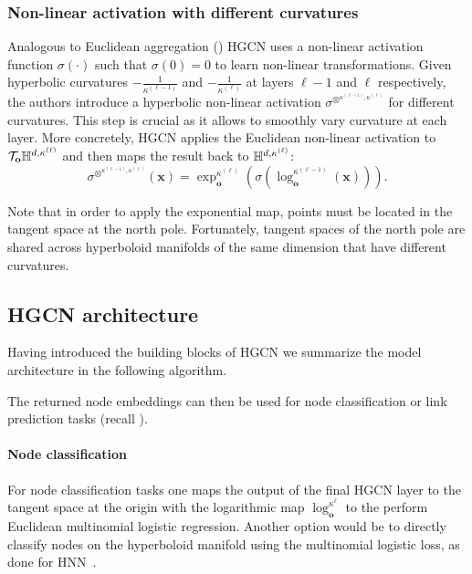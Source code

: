 \subsubsection{Non-linear activation with different curvatures}
Analogous to Euclidean aggregation () HGCN uses a non-linear activation function $\sigma(\cdot)$ such that $\sigma(0)=0$ to learn non-linear transformations. Given hyperbolic curvatures $-\frac{1}{\kappa^{(\ell-1)}}$ and $-\frac{1}{\kappa^{(\ell)}}$ at layers $\ell-1$ and $\ell$ respectively, the authors introduce a hyperbolic non-linear activation $\sigma^{\otimes^{\kappa^{(\ell-1)}, \kappa^{(\ell)}}}$ for different curvatures. This step is crucial as it allows to smoothly vary curvature at each layer. More concretely, HGCN applies the Euclidean non-linear activation to $\mathcal{T}_\mathbf{o}\mathbb{H}^{d,\kappa^{(\ell)}}$ and then maps the result back to $\mathbb{H}^{d,\kappa^{(\ell)}}$:
\begin{equation*}
    \sigma^{\otimes^{\kappa^{(\ell-1)}, \kappa^{(\ell)}}}(\mathbf{x}) = \exp_{\mathbf{o}}^{\kappa^{(\ell)}}\left(\sigma\left(\log_{\mathbf{o}}^{\kappa^{(\ell-1)}}(\mathbf{x})\right)\right).
\end{equation*}

Note that in order to apply the exponential map, points must be located in the tangent space at the north pole. Fortunately, tangent spaces of the north pole are shared across hyperboloid manifolds of the same dimension that have different curvatures.

\subsection{HGCN architecture}\label{sec:hgcnArchitecture}
Having introduced the building blocks of HGCN we summarize the model architecture in the following algorithm.


The returned node embeddings can then be used for node classification or link prediction tasks (recall ).

\paragraph{Node classification}
For node classification tasks one maps the output of the final HGCN layer to the tangent space at the origin with the logarithmic map $\log_\mathbf{o}^{\kappa^\ell}$ to the perform Euclidean multinomial logistic regression. Another option would be to directly classify nodes on the hyperboloid manifold using the multinomial logistic loss, as done for HNN~\cite{ganea2018HNN}.

